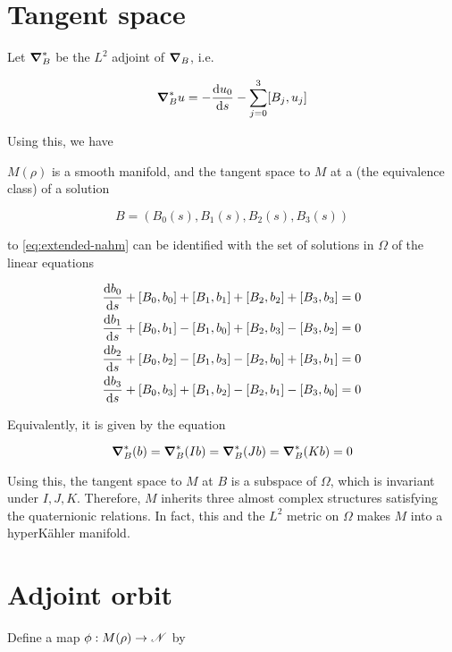 \documentclass{report}
\begin{document}
\section{Tangent space}

Let \(\grad_B^*\) be the \(L^2\) adjoint of \(\grad_B\), i.e.

\[\grad_B^*u = - \dv{u_0}{s} - \sum_{j=0}^3[B_j, u_j]\]

Using this, we have

\begin{proposition}
    \label{prop:tangent-space} \(M(\rho)\) is a smooth manifold, and the tangent space to \(M\) at a (the equivalence class) of a solution 
    
    \[B = (B_0(s), B_1(s), B_2(s), B_3(s))\] 
    
    to \cref{eq:extended-nahm} can be identified with the set of solutions in \(\Omega\) of the linear equations

    \begin{equation}
        \label{eq:tangent-space}
        \begin{split}
            \dv{b_0}{s} + [B_0, b_0] + [B_1, b_1] + [B_2, b_2] + [B_3, b_3] &= 0 \\
            \dv{b_1}{s} + [B_0, b_1] - [B_1, b_0] + [B_2, b_3] - [B_3, b_2] &= 0 \\
            \dv{b_2}{s} + [B_0, b_2] - [B_1, b_3] - [B_2, b_0] + [B_3, b_1] &= 0 \\
            \dv{b_3}{s} + [B_0, b_3] + [B_1, b_2] - [B_2, b_1] - [B_3, b_0] &= 0
        \end{split}
    \end{equation}

    Equivalently, it is given by the equation

    \[\grad^*_B(b) = \grad^*_B(Ib) = \grad^*_B(Jb) = \grad^*_B(Kb) = 0\]
\end{proposition}

Using this, the tangent space to \(M\) at \(B\) is a subspace of \(\Omega\), which is invariant under \(I, J, K\). Therefore, \(M\) inherits three almost complex structures satisfying the quaternionic relations. In fact, this and the \(L^2\) metric on \(\Omega\) makes \(M\) into a hyperK\"ahler manifold.

\section{Adjoint orbit}

Define a map \(\phi : M(\rho) \to \mathscr{N}\) by
\end{document}
